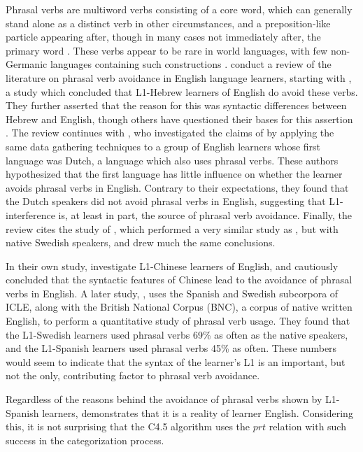 \documentclass[main.tex]{subfiles}
\begin{document}
Phrasal verbs are multiword verbs consisting of a core word, which can generally stand alone as a distinct verb in other circumstances, and a preposition-like particle appearing after, though in many cases not immediately after, the primary word \citep{celce-murcia:1999}. These verbs appear to be rare in world languages, with few non-Germanic languages containing such constructions \citep{celce-murcia:1999}. \citet{liao:2004} conduct a review of the literature on phrasal verb avoidance in English language learners, starting with \citet{dagut:1985}, a study which concluded that L1-Hebrew learners of English do avoid these verbs. They further asserted that the reason for this was syntactic differences between Hebrew and English, though others have questioned their bases for this assertion \citep{liao:2004}. The review continues with \citet{hulstijn:1989}, who investigated the claims of \citeauthor{dagut:1985} by applying the same data gathering techniques to a group of English learners whose first language was Dutch, a language which also uses phrasal verbs. These authors hypothesized that the first language has little influence on whether the learner avoids phrasal verbs in English.  Contrary to their expectations, they found that the Dutch speakers did not avoid phrasal verbs in English, suggesting that L1-interference is, at least in part, the source of phrasal verb avoidance. Finally, the review cites the study of \citet{laufer:1993}, which performed a very similar study as \citeauthor{hulstijn:1989}, but with native Swedish speakers, and drew much the same conclusions.

In their own study, \citeauthor{liao:2004} investigate L1-Chinese learners of English, and cautiously concluded that the syntactic features of Chinese lead to the avoidance of phrasal verbs in English. A later study, \citet{gonzalez:2010}, uses the Spanish and Swedish subcorpora of ICLE, along with the British National Corpus (BNC), a corpus of native written English, to perform a quantitative study of phrasal verb usage. They found that the L1-Swedish learners used phrasal verbs 69\% as often as the native speakers, and the L1-Spanish learners used phrasal verbs 45\% as often. These numbers would seem to indicate that the syntax of the learner's L1 is an important, but not the only, contributing factor to phrasal verb avoidance.

Regardless of the reasons behind the avoidance of phrasal verbs shown by L1-Spanish learners, \citet{gonzalez:2010} demonstrates that it is a reality of learner English. Considering this, it is not surprising that the C4.5 algorithm uses the $prt$ relation with such success in the categorization process.
\end{document}
